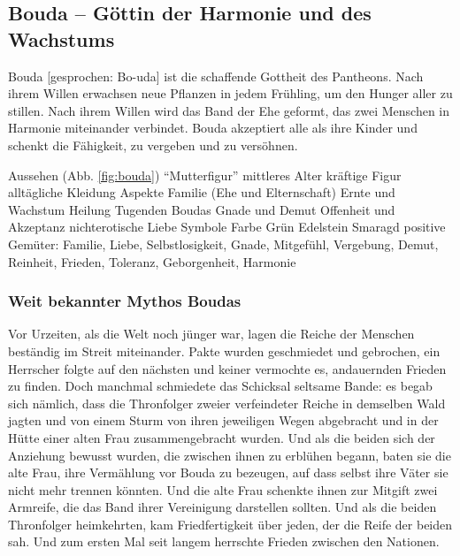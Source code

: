 \subsection{Bouda -- Göttin der Harmonie und des Wachstums}
Bouda [gesprochen: Bo-uda] ist die schaffende Gottheit des Pantheons. 
Nach ihrem Willen erwachsen neue Pflanzen in jedem Frühling, um den Hunger aller zu stillen. 
Nach ihrem Willen wird das Band der Ehe geformt, das zwei Menschen in Harmonie miteinander verbindet. 
Bouda akzeptiert alle als ihre Kinder und schenkt die Fähigkeit, zu vergeben und zu versöhnen.
\begin{outline}
	\1 Aussehen (Abb. \ref{fig:bouda})
		\2 ``Mutterfigur''
		\2 mittleres Alter 
		\2 kräftige Figur
		\2 alltägliche Kleidung 
	\1 Aspekte
		\2 Familie (Ehe und Elternschaft)
		\2 Ernte und Wachstum
		\2 Heilung
	\1 Tugenden Boudas
		\2 Gnade und Demut
		\2 Offenheit und Akzeptanz
		\2 nichterotische Liebe
	\1 Symbole
		\2 Farbe Grün
		\2 Edelstein Smaragd
	\1 positive Gemüter: Familie, Liebe, Selbstlosigkeit, Gnade, Mitgefühl, Vergebung, Demut, Reinheit, Frieden, Toleranz, Geborgenheit, Harmonie
\end{outline}

\subsubsection{Weit bekannter Mythos Boudas}
Vor Urzeiten, als die Welt noch jünger war, lagen die Reiche der Menschen beständig im Streit miteinander. 
Pakte wurden geschmiedet und gebrochen, ein Herrscher folgte auf den nächsten und keiner vermochte es, andauernden Frieden zu finden. 
Doch manchmal schmiedete das Schicksal seltsame Bande: 
es begab sich nämlich, dass die Thronfolger zweier verfeindeter Reiche in demselben Wald jagten und von einem Sturm von ihren jeweiligen Wegen abgebracht und in der Hütte einer alten Frau zusammengebracht wurden. 
Und als die beiden sich der Anziehung bewusst wurden, die zwischen ihnen zu erblühen begann, baten sie die alte Frau, ihre Vermählung vor Bouda zu bezeugen, auf dass selbst ihre Väter sie nicht mehr trennen könnten. 
Und die alte Frau schenkte ihnen zur Mitgift zwei Armreife, die das Band ihrer Vereinigung darstellen sollten. 
Und als die beiden Thronfolger heimkehrten, kam Friedfertigkeit über jeden, der die Reife der beiden sah. 
Und zum ersten Mal seit langem herrschte Frieden zwischen den Nationen.

